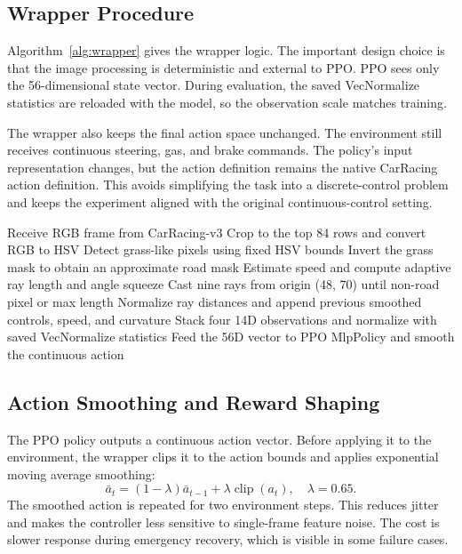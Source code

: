 \documentclass[conference]{IEEEtran}
\begin{document}
\subsection{Wrapper Procedure}

Algorithm~\ref{alg:wrapper} gives the wrapper logic. The important design choice is that the image processing is deterministic and external to PPO. PPO sees only the 56-dimensional state vector. During evaluation, the saved VecNormalize statistics are reloaded with the model, so the observation scale matches training.

The wrapper also keeps the final action space unchanged. The environment still receives continuous steering, gas, and brake commands. The policy's input representation changes, but the action definition remains the native CarRacing action definition. This avoids simplifying the task into a discrete-control problem and keeps the experiment aligned with the original continuous-control setting.

\begin{algorithm}[t]
\caption{Road-Mask Ray Wrapper}
\label{alg:wrapper}
\begin{algorithmic}[1]
\STATE Receive RGB frame from CarRacing-v3
\STATE Crop to the top 84 rows and convert RGB to HSV
\STATE Detect grass-like pixels using fixed HSV bounds
\STATE Invert the grass mask to obtain an approximate road mask
\STATE Estimate speed and compute adaptive ray length and angle squeeze
\STATE Cast nine rays from origin (48, 70) until non-road pixel or max length
\STATE Normalize ray distances and append previous smoothed controls, speed, and curvature
\STATE Stack four 14D observations and normalize with saved VecNormalize statistics
\STATE Feed the 56D vector to PPO MlpPolicy and smooth the continuous action
\end{algorithmic}
\end{algorithm}

\subsection{Action Smoothing and Reward Shaping}

The PPO policy outputs a continuous action vector. Before applying it to the environment, the wrapper clips it to the action bounds and applies exponential moving average smoothing:
\begin{equation}
\bar a_t = (1-\lambda)\bar a_{t-1} + \lambda \operatorname{clip}(a_t),
\quad \lambda = 0.65.
\end{equation}
The smoothed action is repeated for two environment steps. This reduces jitter and makes the controller less sensitive to single-frame feature noise. The cost is slower response during emergency recovery, which is visible in some failure cases.
\end{document}

